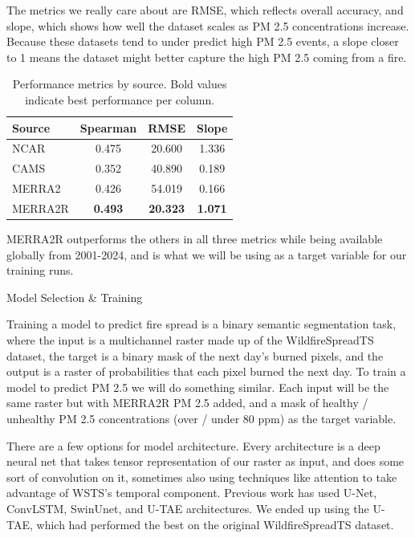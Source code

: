 \documentclass[final]{beamer}
\newlength{\colwidth}
\begin{document}
\begin{frame}[t]
\begin{columns}[t]
\begin{column}{\colwidth}
The metrics we really care about are RMSE, which reflects overall accuracy, and slope, which shows how well the dataset scales as PM 2.5 concentrations increase. Because these datasets tend to under predict high PM 2.5 events, a slope closer to 1 means the dataset might better capture the high PM 2.5 coming from a fire.


\begin{table}[h!]
\centering
\small %
\begin{tabular}{lccc}
\toprule
\textbf{Source} & \textbf{Spearman} & \textbf{RMSE} & \textbf{Slope} \\
\midrule
NCAR   & 0.475 & 20.600 & 1.336 \\
CAMS    & 0.352 & 40.890 & 0.189 \\
MERRA2  & 0.426 & 54.019 & 0.166 \\
MERRA2R & \textbf{0.493} & \textbf{20.323} & \textbf{1.071} \\
\bottomrule
\end{tabular}
\caption{Performance metrics by source. Bold values indicate best performance per column.}
\label{tab:placeholder}
\end{table}

MERRA2R outperforms the others in all three metrics while being available globally from 2001-2024, and is what we will be using as a target variable for our training runs.

  \begin{block}{Model Selection \& Training}

  Training a model to predict fire spread is a binary semantic segmentation task, where the input is a multichannel raster made up of the WildfireSpreadTS dataset, the target is a binary mask of the next day's burned pixels, and the output is a raster of probabilities that each pixel burned the next day. To train a model to predict PM 2.5 we will do something similar. Each input will be the same raster but with MERRA2R PM 2.5 added, and a mask of healthy / unhealthy PM 2.5 concentrations (over / under 80 ppm) as the target variable. 

  There are a few options for model architecture. Every architecture is a deep neural net that takes tensor representation of our raster as input, and does some sort of convolution on it, sometimes also using techniques like attention to take advantage of WSTS's temporal component. Previous work has used U-Net, ConvLSTM, SwinUnet, and U-TAE architectures. We ended up using the U-TAE, which had performed the best on the original WildfireSpreadTS dataset.


\end{block}
\end{column}
\end{columns}
\end{frame}
\end{document}
